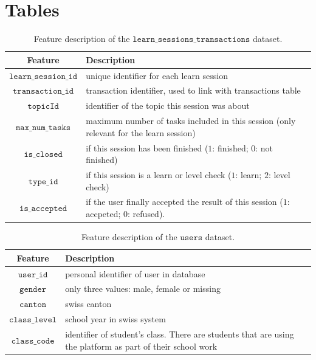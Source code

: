\documentclass[sigplan,screen]{acmart}
\begin{document}




\appendix

\section{Tables}

\begin{table}[h]
  \caption{Feature description of the $\texttt{learn\_sessions\_transactions}$ dataset.}
  \label{tab:learn}
  \begin{tabular}{cl}
    \toprule
    \textbf{Feature}&\textbf{Description}\\
    \midrule
    $\texttt{learn\_session\_id}$ & unique identifier for each learn session \\
    $\texttt{transaction\_id}$ & transaction identifier, used to link with transactions table \\
    $\texttt{topicId}$ & identifier of the topic this session was about \\
    $\texttt{max\_num\_tasks}$ & maximum number of tasks included in this session (only relevant for the learn session) \\
    $\texttt{is\_closed}$ & if this session has been finished ($1$: finished; $0$: not finished) \\
    $\texttt{type\_id}$ & if this session is a learn or level check ($1$: learn; $2$: level check) \\
    $\texttt{is\_accepted}$ & if the user finally accepted the result of this session ($1$: accpeted; $0$: refused). \\
    \bottomrule
    \end{tabular}
\end{table}

\begin{table}[h]
  \caption{Feature description of the $\texttt{users}$ dataset.}
  \label{tab:users}
  \begin{tabular}{cl}
    \toprule
    \textbf{Feature}&\textbf{Description}\\
    \midrule
    $\texttt{user\_id}$ & personal identifier of user in database \\
    $\texttt{gender}$ & only three values: male, female or missing \\
    $\texttt{canton}$ & swiss canton \\
    $\texttt{class\_level}$ & school year in swiss system \\
    $\texttt{class\_code}$ & identifier of student's class. There are students that are using the platform as part of their school work \\
    \bottomrule
    \end{tabular}
\end{table}
\end{document}
